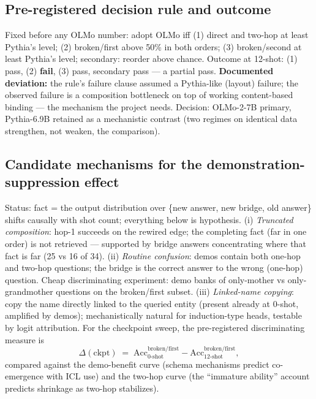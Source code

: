 \documentclass[11pt,a4paper]{article}
\begin{document}
\subsection{Pre-registered decision rule and outcome}
Fixed before any OLMo number: adopt OLMo iff (1) direct and two-hop at least Pythia's level; (2) broken/first above 50\% in both orders; (3) broken/second at least Pythia's level; secondary: reorder above chance. Outcome at 12-shot: (1) pass, (2) \textbf{fail}, (3) pass, secondary pass --- a partial pass. \textbf{Documented deviation:} the rule's failure clause assumed a Pythia-like (layout) failure; the observed failure is a composition bottleneck on top of working content-based binding --- the mechanism the project needs. Decision: OLMo-2-7B primary, Pythia-6.9B retained as a mechanistic contrast (two regimes on identical data strengthen, not weaken, the comparison).

\subsection{Candidate mechanisms for the demonstration-suppression effect}
Status: fact = the output distribution over \{new answer, new bridge, old answer\} shifts causally with shot count; everything below is hypothesis. (i) \emph{Truncated composition}: hop-1 succeeds on the rewired edge; the completing fact (far in one order) is not retrieved --- supported by bridge answers concentrating where that fact is far (25 vs 16 of 34). (ii) \emph{Routine confusion}: demos contain both one-hop and two-hop questions; the bridge is the correct answer to the wrong (one-hop) question. Cheap discriminating experiment: demo banks of only-mother vs only-grandmother questions on the broken/first subset. (iii) \emph{Linked-name copying}: copy the name directly linked to the queried entity (present already at 0-shot, amplified by demos); mechanistically natural for induction-type heads, testable by logit attribution. For the checkpoint sweep, the pre-registered discriminating measure is
\[
\Delta(\text{ckpt}) \;=\; \mathrm{Acc}^{\text{broken/first}}_{\text{0-shot}}-\mathrm{Acc}^{\text{broken/first}}_{\text{12-shot}},
\]
compared against the demo-benefit curve (schema mechanisms predict co-emergence with ICL use) and the two-hop curve (the ``immature ability'' account predicts shrinkage as two-hop stabilizes).
\end{document}
